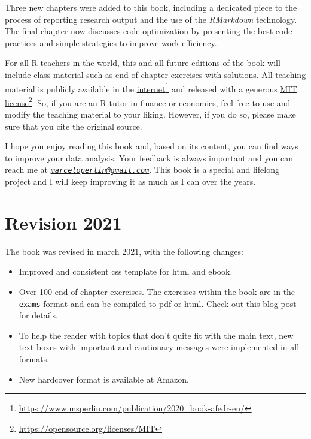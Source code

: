 \documentclass[
  12pt,
]{book}
\providecommand{\tightlist}{%
  \setlength{\itemsep}{0pt}\setlength{\parskip}{0pt}}
\begin{document}
Three new chapters were added to this book, including a dedicated piece to the process of reporting research output and the use of the \emph{RMarkdown} technology. The final chapter now discusses code optimization by presenting the best code practices and simple strategies to improve work efficiency.

For all R teachers in the world, this and all future editions of the book will include class material such as end-of-chapter exercises with solutions. All teaching material is publicly available in the \href{https://www.msperlin.com/publication/2020_book-afedr-en/}{internet}\footnote{\url{https://www.msperlin.com/publication/2020_book-afedr-en/}} and released with a generous \href{https://opensource.org/licenses/MIT}{MIT license}\footnote{\url{https://opensource.org/licenses/MIT}}. So, if you are an R tutor in finance or economics, feel free to use and modify the teaching material to your liking. However, if you do so, please make sure that you cite the original source.

I hope you enjoy reading this book and, based on its content, you can find ways to improve your data analysis. Your feedback is always important and you can reach me at \emph{\href{mailto:marceloperlin@gmail.com}{\nolinkurl{marceloperlin@gmail.com}}}. This book is a special and lifelong project and I will keep improving it as much as I can over the years.

\hypertarget{revision-2021}{%
\section*{Revision 2021}\label{revision-2021}}

The book was revised in march 2021, with the following changes:

\begin{itemize}
\tightlist
\item
  Improved and consistent css template for html and ebook.
\item
  Over 100 end of chapter exercises. The exercises within the book are in the \texttt{exams} \citep{R-exams} format and can be compiled to pdf or html. Check out this \href{https://www.msperlin.com/post/2021-02-28-dynamic-exercises-afedr/}{blog post} for details.
\item
  To help the reader with topics that don't quite fit with the main text, new text boxes with important and cautionary messages were implemented in all formats.
\item
  New hardcover format is available at Amazon.
\end{itemize}
\end{document}
